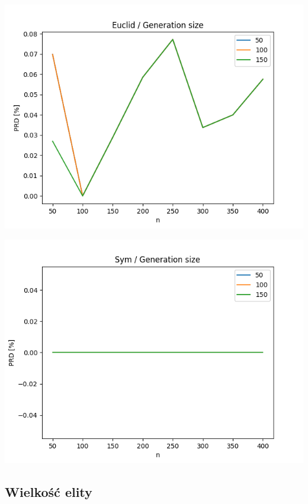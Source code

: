 \documentclass{article}
\begin{document}
\begin{center}
\includegraphics[width=\textwidth, 
                   height = 0.4\textheight, 
                   keepaspectratio]
                  {plots/euclid_3_generation_size} 
\end{center}

\begin{center}
\includegraphics[width=\textwidth, 
                   height = 0.4\textheight, 
                   keepaspectratio]
                  {plots/sym_3_generation_size} 
\end{center}


\subsection{Wielkość elity}
\end{document}
